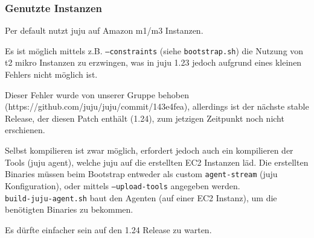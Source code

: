\subsubsection{Genutzte Instanzen}

Per default nutzt juju auf Amazon m1/m3 Instanzen.

Es ist möglich mittels z.B. \texttt{--constraints} (siehe \texttt{bootstrap.sh}) die Nutzung von t2 mikro Instanzen zu erzwingen, was in juju 1.23 jedoch aufgrund eines kleinen Fehlers nicht möglich ist.

Dieser Fehler wurde von unserer Gruppe behoben (https://github.com/juju/juju/commit/143e4fea), allerdings ist der nächste stable Release, der diesen Patch enthält (1.24), zum jetzigen Zeitpunkt noch nicht erschienen.

Selbst kompilieren ist zwar möglich, erfordert jedoch auch ein kompilieren der Tools (juju agent), welche juju auf die erstellten EC2 Instanzen läd.
Die erstellten Binaries müssen beim Bootstrap entweder als custom \texttt{agent-stream} (juju Konfiguration), oder mittels \texttt{--upload-tools} angegeben werden. \\
\texttt{build-juju-agent.sh} baut den Agenten (auf einer EC2 Instanz), um die benötigten Binaries zu bekommen.

Es dürfte einfacher sein auf den 1.24 Release zu warten.
